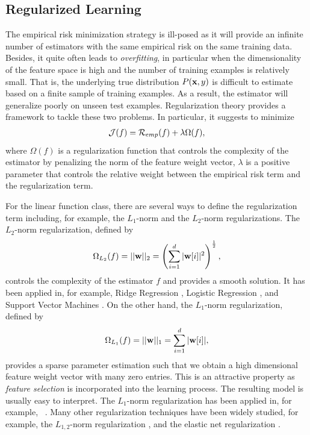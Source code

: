 \subsection{Regularized Learning}\label{sc_rl}

The empirical risk minimization strategy is ill-posed as it will provide an infinite number of estimators with the same empirical risk on the same training data.
Besides, it quite often leads to \textit{overfitting}, in particular when the dimensionality of the feature space is high and the number of training examples is relatively small.
That is, the underlying true distribution $P(\mathbf {x},y)$ is difficult to estimate based on a finite sample of training examples.
As a result, the estimator will generalize poorly on unseen test examples.
Regularization theory \citep{Evgeniou99a,Evgeniou02regularization} provides a framework to tackle these two problems.
In particular, it suggests to minimize 
 \begin{align}
	\mathcal{J}(f) = \mathcal{R}_{emp}(f) + \lambda\Omega(f), \label{rl}
\end{align}
where $\Omega(f)$ is a regularization function that controls the complexity of the estimator by penalizing the norm of the feature weight vector, $\lambda$ is a positive parameter that controls the relative weight between the empirical risk term and the regularization term.

For the linear function class, there are several ways to define the regularization term including, for example, the $L_1$-norm and the $L_2$-norm regularizations.
The $L_2$-norm regularization, defined by 
\begin{align}
	\Omega_{L_2}(f) = ||\mathbf {w}||_2=\left(\sum_{i=1}^d|\mathbf {w}[i]|^2\right)^{\frac{1}{2}}, \label{l2_norm}
\end{align} 
controls the complexity of the estimator $f$ and provides a smooth solution.
It has been applied in, for example, Ridge Regression \citep{Hoerl00ridge}, Logistic Regression \citep{Chen00}, and Support Vector Machines \citep{Cortes95support}.
On the other hand, the $L_1$-norm regularization, defined by
\begin{align*}
	\Omega_{L_1}(f) = ||\mathbf {w}||_1=\sum_{i=1}^d|\mathbf {w}[i]|,
\end{align*}
provides a sparse parameter estimation such that we obtain a high dimensional feature weight vector with many zero entries.
This is an attractive property as \textit{feature selection} is incorporated into the learning process.
The resulting model is usually easy to interpret.
The $L_1$-norm regularization has been applied in, for example, \lasso\ \citep{Tibshirani94regression}.
Many other regularization techniques have been widely studied, for example, the $L_{1,2}$-norm regularization \citep{Argyriou07multitask}, and the elastic net regularization \citep{Zou05regularizationa}.


